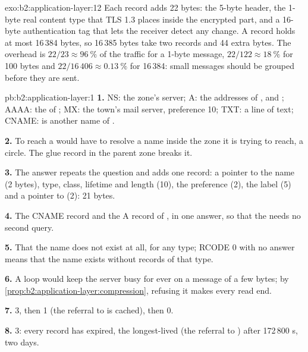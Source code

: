 \begin{solution}{exo:b2:application-layer:12}
Each record adds 22 bytes: the 5-byte header, the 1-byte real content type that TLS 1.3 places inside the encrypted
part, and a 16-byte authentication tag that lets the receiver detect any change. A record holds at most 16\,384 bytes,
so 16\,385 bytes take two records and 44 extra bytes. The overhead is $22/23 \approx 96~\%$ of the traffic for a 1-byte
message, $22/122 \approx 18~\%$ for 100 bytes and $22/16\,406 \approx 0.13~\%$ for 16\,384: small messages should be
grouped before they are sent.
\end{solution}

\begin{solution}{pb:b2:application-layer:1}
\textbf{1.} NS: the zone's server; A: the addresses of ,  and ; AAAA: the 
of ; MX: the town's mail server, preference 10; TXT: a line of text; CNAME:  is another name
of .

\textbf{2.} To reach  a  would have to resolve a name inside the zone it is trying to
reach, a circle. The glue record in the parent zone breaks it.

\textbf{3.} The answer repeats the question and adds one record: a pointer to the name (2 bytes), type, class,
lifetime and length (10), the preference (2), the label  (5) and a pointer to  (2):
21 bytes.

\textbf{4.} The CNAME record and the A record of , in one answer, so that the  needs no second
query.

\textbf{5.} That the name does not exist at all, for any type; RCODE 0 with no answer means that the name exists
without records of that type.

\textbf{6.} A loop would keep the server busy for ever on a message of a few bytes; by
\cref{prop:b2:application-layer:compression}, refusing it makes every read end.

\textbf{7.} 3, then 1 (the referral to  is cached), then 0.

\textbf{8.} 3: every record has expired, the longest-lived (the referral to ) after 172\,800 s, two days.


\end{solution}
